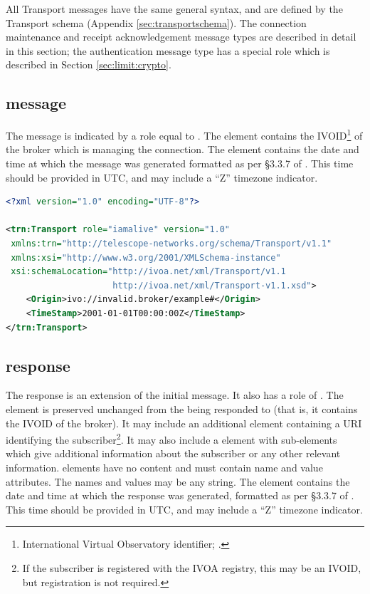 \documentclass[a4paper,11pt]{ivoa}
\begin{document}
All Transport messages have the same general syntax, and are defined by the
Transport schema (Appendix \ref{sec:transportschema}). The connection
maintenance and receipt acknowledgement message types are described in detail
in this section; the authentication message type has a special role which is
described in Section \ref{sec:limit:crypto}.

\subsection{ message}
\label{sec:transport:iamalive}

The  message is indicated by a role equal to .
The  element contains the IVOID\footnote{International
Virtual Observatory identifier; \citet{std:VOID2}.} of the broker which is
managing the connection. The  element contains the date
and time at which the message was generated formatted as per \S3.3.7 of
\citet{Peterson:2012}. This time should be provided in UTC, and may include a
“Z” timezone indicator.

\begin{lstlisting}[language=xml,caption=Sample \xmlel{iamalive} message.,
                   label=lst:iamalive]
<?xml version="1.0" encoding="UTF-8"?>

<trn:Transport role="iamalive" version="1.0"
 xmlns:trn="http://telescope-networks.org/schema/Transport/v1.1"
 xmlns:xsi="http://www.w3.org/2001/XMLSchema-instance"
 xsi:schemaLocation="http://ivoa.net/xml/Transport/v1.1
                     http://ivoa.net/xml/Transport-v1.1.xsd">
    <Origin>ivo://invalid.broker/example#</Origin>
    <TimeStamp>2001-01-01T00:00:00Z</TimeStamp>
</trn:Transport>
\end{lstlisting}

\subsection{ response}
\label{sec:transport:iamaliveresponse}

The  response is an extension of the initial 
message. It also has a role of . The 
element is preserved unchanged from the  being responded to
(that is, it contains the IVOID of the broker). It may include an additional
 element containing a URI identifying the
subscriber\footnote{If the subscriber is registered with the IVOA registry,
this may be an IVOID, but registration is not required.}. It may also include
a  element with  sub-elements which give
additional information about the subscriber or any other relevant information.
 elements have no content and must contain name and value
attributes. The names and values may be any string. The 
element contains the date and time at which the response was generated,
formatted as per \S3.3.7 of \citet{Peterson:2012}. This time should be
provided in UTC, and may include a “Z” timezone indicator.
\end{document}
